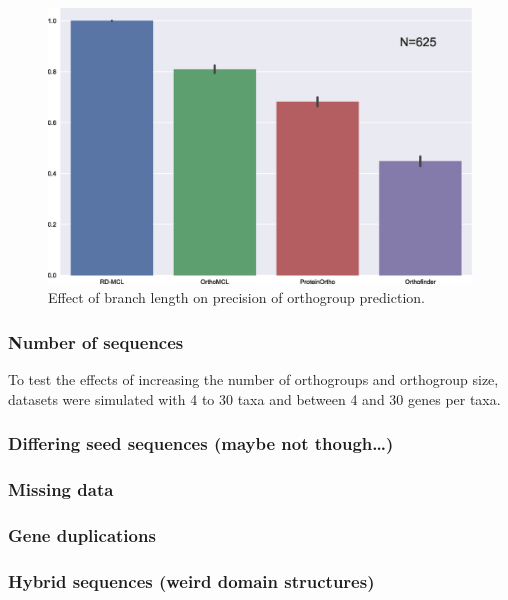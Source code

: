 \documentclass[twocolumn]{bmcart}%
\begin{document}
\begin{figure}[t]
  \begin{center}
  \includegraphics[height=0.22\textheight]{../figures/branch_len_bargraph.eps}
\end{center}
\caption{Effect of branch length on precision of orthogroup prediction.}
\label{fig:branch_len_std}
\end{figure}


\subsubsection{Number of sequences}
To test the effects of increasing the number of orthogroups and orthogroup size, datasets were simulated with 4 to 30 taxa and between 4 and 30 genes per taxa.

\subsubsection{Differing seed sequences (maybe not though\ldots)}
\lipsum[2]

\subsubsection{Missing data}
\lipsum[1]

\subsubsection{Gene duplications}
\lipsum[1]

\subsubsection{Hybrid sequences (weird domain structures)}
\lipsum[1]
\end{document}

